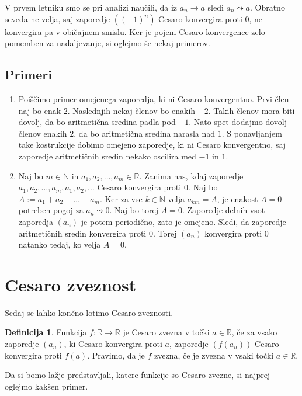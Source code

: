 \documentclass[a4paper,12pt]{article}
\theoremstyle{definition}
\newtheorem{definicija}{Definicija}
\theoremstyle{plain}
\begin{document}
V prvem letniku smo se pri analizi naučili, da iz $a_n \rightarrow a$ sledi $a_n \leadsto a$. Obratno seveda ne velja, saj zaporedje $((-1)^n)$ Cesaro konvergira proti $0$, ne konvergira pa v običajnem smislu. Ker je pojem Cesaro konvergence zelo pomemben za nadaljevanje, si oglejmo še nekaj primerov.

\subsection*{Primeri}
\begin{enumerate}
    \item Poiščimo primer omejenega zaporedja, ki ni Cesaro konvergentno. Prvi člen naj bo enak $2$. Naslednjih nekaj členov bo enakih $-2$. Takih členov mora biti dovolj, da bo aritmetična sredina padla pod $-1$. Nato spet dodajmo dovolj členov enakih $2$, da bo aritmetična sredina narasla nad $1$. S ponavljanjem take kostrukcije dobimo omejeno zaporedje, ki ni Cesaro konvergentno, saj zaporedje aritmetičnih sredin nekako oscilira med $-1$ in $1$.
    \item Naj bo $m \in \mathbb{N}$ in $a_1, a_2, \ldots, a_m \in \mathbb{R}$. Zanima nas, kdaj zaporedje $a_1, a_2, \ldots, a_m, a_1, a_2, \ldots$ Cesaro konvergira proti $0$. Naj bo $A := a_1 + a_2 + \ldots + a_m$. Ker za vse $k \in \mathbb{N}$ velja $\overline{a}_{km} = A$, je enakost $A = 0$ potreben pogoj za $a_n \leadsto 0$. Naj bo torej $A = 0$. Zaporedje delnih vsot zaporedja $(a_n)$ je potem periodično, zato je omejeno. Sledi, da zaporedje aritmetičnih sredin konvergira proti $0$. Torej $(a_n)$ konvergira proti $0$ natanko tedaj, ko velja $A = 0$.
\end{enumerate}



\section{Cesaro zveznost}
Sedaj se lahko končno lotimo Cesaro zveznosti.

\begin{definicija}
    Funkcija $f: \mathbb{R} \rightarrow \mathbb{R}$ je Cesaro zvezna v točki $a \in \mathbb{R}$, če za vsako zaporedje $(a_n)$, ki Cesaro konvergira proti $a$, zaporedje $(f(a_n))$ Cesaro konvergira proti $f(a)$. Pravimo, da je $f$ zvezna, če je zvezna v vsaki točki $a \in \mathbb{R}$.
\end{definicija}

Da si bomo lažje predstavljali, katere funkcije so Cesaro zvezne, si najprej oglejmo kakšen primer.
\end{document}
